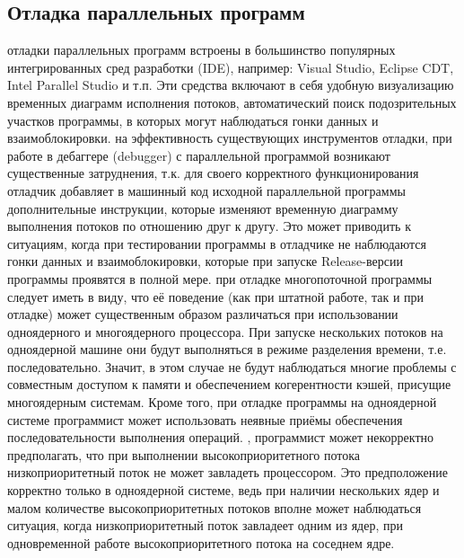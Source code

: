 { %
	\subsection{Отладка параллельных программ}
	 отладки параллельных программ встроены в большинство популярных интегрированных сред разработки (IDE), например: Visual Studio, Eclipse CDT, Intel Parallel Studio и т.п. Эти средства включают в себя удобную визуализацию временных диаграмм исполнения потоков, автоматический поиск подозрительных участков программы, в которых могут наблюдаться гонки данных и взаимоблокировки.
	 на эффективность существующих инструментов отладки, при работе в дебаггере (debugger) с параллельной программой возникают существенные затруднения, т.к. для своего корректного функционирования отладчик добавляет в машинный код исходной параллельной программы дополнительные инструкции, которые изменяют временную диаграмму выполнения потоков по отношению друг к другу. Это может приводить к ситуациям, когда при тестировании программы в отладчике не наблюдаются гонки данных и взаимоблокировки, которые при запуске Release-версии программы проявятся в полной мере.
	 при отладке многопоточной программы следует иметь в виду, что её поведение (как при штатной работе, так и при отладке) может существенным образом различаться при использовании одноядерного и многоядерного процессора. При запуске нескольких потоков на одноядерной машине они будут выполняться в режиме разделения времени, т.е. последовательно. Значит, в этом случае не будут наблюдаться многие проблемы с совместным доступом к памяти и обеспечением когерентности кэшей, присущие многоядерным системам. Кроме того, при отладке программы на одноядерной системе программист может использовать неявные приёмы обеспечения последовательности выполнения операций. 
	, программист может некорректно предполагать, что при выполнении высокоприоритетного потока низкоприоритетный поток не может завладеть процессором. Это предположение корректно только в одноядерной системе, ведь при наличии нескольких ядер и малом количестве высокоприоритетных потоков вполне может наблюдаться ситуация, когда низкоприоритетный поток завладеет одним из ядер, при одновременной работе высокоприоритетного потока на соседнем ядре.
	\par
}